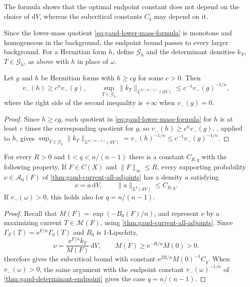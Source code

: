 The formula shows that the optimal endpoint constant does not depend on the choice of $\mathrm{d}V$, whereas the subcritical constants $C_q$ may depend on it.

Since the lower-mass quotient \eqref{eq:gaud-lower-mass-formula} is monotone and homogeneous in the background, the endpoint bound passes to every larger background. For a Hermitian form $h$, define $\mathscr G_h$ and the determinant densities $k_T$, $T\in\mathscr G_h$, as above with $h$ in place of $\omega$.

\begin{corollary}\label{cor:gaud-determinant-background-comparison}\label{lem:determinant-background-transport}
Let $g$ and $h$ be Hermitian forms with $h\geq cg$ for some $c>0$. Then
\begin{equation}\label{eq:determinant-background-transport}
 v_-(h)\geq c^nv_-(g),\qquad
 \sup_{T\in\mathscr G_h}\|k_T\|_{L^{n/(n-1)}(\mathrm dV)}
 \leq c^{-1}v_-(g)^{-1/n},
\end{equation}
where the right side of the second inequality is $+\infty$ when $v_-(g)=0$.
\end{corollary}
\begin{proof}
Since $h\geq cg$, each quotient in \eqref{eq:gaud-lower-mass-formula} for $h$ is at least $c$ times the corresponding quotient for $g$, so $v_-(h)\geq c^nv_-(g)$. , applied to $h$, gives $\sup_{T\in\mathscr G_h}\|k_T\|_{L^{n/(n-1)}(\mathrm dV)}=v_-(h)^{-1/n}\leq c^{-1}v_-(g)^{-1/n}$.
\end{proof}

\begin{corollary}\label{cor:gaud-adjoint-lq}
For every $R>0$ and $1<q<n/(n-1)$ there is a constant $C_{R,q}$ with the following property. If $F\in C(X)$ and $\|F\|_\infty\leq R$, every supporting probability $\nu\in\mathcal A_0(F)$ of \cref{thm:gaud-current-all-adjoints} has a density $a$ satisfying
\[
 \nu=a\,\mathrm{d}V,\qquad\|a\|_{L^q(\mathrm{d}V)}\leq C_{R,q}.
\]
If $v_-(\omega)>0$, this holds also for $q=n/(n-1)$.
\end{corollary}
\begin{proof}
Recall that $M(F)=\exp(-B_0(F)/n)$, and represent $\nu$ by a maximizing current $T\in\mathscr M(F)$, using \cref{thm:gaud-current-all-adjoints}. Since $\Gamma_F(T)=\mathrm{e}^{F/n}\Gamma_0(T)$ and $B_0$ is $1$-Lipschitz,
\[
 \nu=\frac{\mathrm{e}^{F/n}k_T}{M(F)}\,\mathrm{d}V,
 \qquad M(F)\geq \mathrm{e}^{-R/n}M(0)>0.
\]
 therefore gives the subcritical bound with constant $\mathrm{e}^{2R/n}M(0)^{-1}C_q$. When $v_-(\omega)>0$, the same argument with the endpoint constant $v_-(\omega)^{-1/n}$ of \cref{thm:gaud-determinant-endpoint} gives the case $q=n/(n-1)$.
\end{proof}

